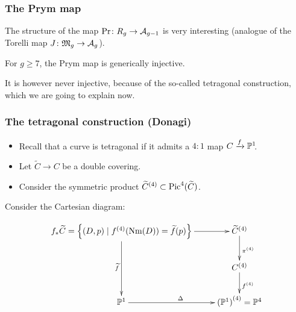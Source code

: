 

\begin{frame}
\frametitle{The Prym map}

The structure of the map $\Pr\colon R_g \to \A_{g-1}$ is very interesting (analogue of the Torelli map $J\colon\mathfrak M_g \to \A_g$).

\pause

\begin{theorem}

For $g \geq 7$, the Prym map is generically injective. 

\end{theorem}
\pause

It is however \alert{never} injective, because of the so-called \alert{tetragonal construction}, which we are going to explain now.
\end{frame}

\begin{frame}
\frametitle{The tetragonal construction (Donagi)}

\begin{itemize}
	\item Recall that a curve is \alert{tetragonal} if it admits a $4:1$ map $C \xrightarrow{f} \P^1\mkern-4mu$.
	\pause
	\item Let $\widetilde C \to C$ be a double covering.
	\pause
	\item Consider the symmetric product ${\widetilde C}^{(4)} \subset \Pic^4(\widetilde C)$.
\end{itemize}
\pause

Consider the Cartesian diagram:

\[
\xymatrix{
f_\ast \widetilde C = \left\{ (D,p) \mid f^{(4)}(\Nm(D)) = \widetilde f (p) \right\} \ar[r] \ar[dd]_{\widetilde f} & {\widetilde C}^{(4)} \ar[d]^{\pi^{(4)}} \\
 & C^{(4)} \ar[d]^{f^{(4)}} \\
\P^1 \ar[r]^\Delta & {(\P^1)}^{(4)} = \P^4
}
\]
\end{frame}

